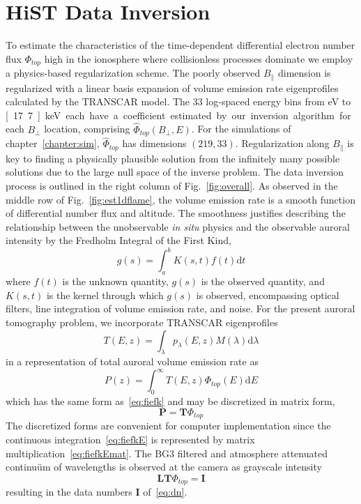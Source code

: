 \section{HiST Data Inversion}\label{sec:inv}

To estimate the characteristics of the time-dependent differential electron number flux $\Phi_{top}$ high in the ionosphere where collisionless processes dominate we employ a physics-based regularization scheme. 
The poorly observed $B_\parallel$ dimension is regularized with a linear basis expansion of volume emission rate eigenprofiles calculated by the TRANSCAR model.
The 33 log-spaced energy bins from \unit[58]{eV} to \unit[17.7]{keV} each have a coefficient estimated by our inversion algorithm for each $B_\perp$ location, comprising $\hat{\Phi}_{top}(B_\perp,E)$.
For the simulations of chapter~\ref{chapter:sim}, $\hat{\Phi}_{top}$ has dimensions $(219,33)$.
Regularization along $B_\parallel$ is key to finding a physically plausible solution from the infinitely many possible solutions due to the large null space of the inverse problem.
The data inversion process is outlined in the right column of Fig.~\ref{fig:overall}.
As observed in the middle row of Fig.~\ref{fig:est1dflame}, the volume emission rate is a smooth function of differential number flux and altitude.
The smoothness justifies describing the relationship between the unobservable \textit{in situ} physics and the observable auroral intensity by the Fredholm Integral of the First Kind,
%
\begin{equation}\label{eq:fiefk}
g(s) = \int_a^b K(s,t)f(t)\textrm{d}t
\end{equation}
%
where $f(t)$ is the unknown quantity, $g(s)$ is the observed quantity, and $K(s,t)$ is the kernel through which $g(s)$ is observed, encompassing optical filters, line integration of volume emission rate, and noise. 
For the present auroral tomography problem, we incorporate TRANSCAR eigenprofiles
\begin{equation}\label{eq:eigentranscar}
T(E,z) = \int_{\lambda} p_\lambda(E,z) M(\lambda) \textrm{d}\lambda
\end{equation}
in a representation of total auroral volume emission rate as
%
\begin{equation}\label{eq:fiefkE}
P(z) = \int_0^\infty T(E,z) \Phi_{top}(E)\textrm{d}E
\end{equation}
%
which has the same form as~\eqref{eq:fiefk} and may be discretized in matrix form,
%
\begin{equation}\label{eq:fiefkEmat}
\mathbf{P} = \mathbf{T}\Phi_{top}
\end{equation}
%
The discretized forms are convenient for computer implementation since the continuous integration~\eqref{eq:fiefkE} is represented by matrix multiplication~\eqref{eq:fiefkEmat}.
The BG3 filtered and atmosphere attenuated continuüm of wavelengths is observed at the camera as grayscale intensity
%
\begin{equation}\label{eq:master}
\textbf{L}\textbf{T}\Phi_{top}=\textbf{I}
\end{equation}
resulting in the data numbers $\mathbf{I}$ of~\eqref{eq:dn}.

